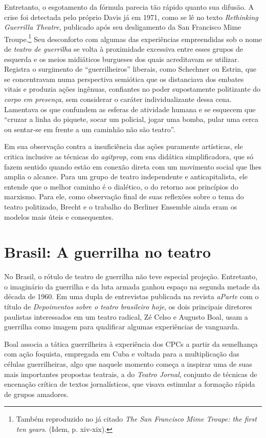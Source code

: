 Entretanto, o esgotamento da fórmula parecia tão rápido quanto sua
difusão. A crise foi detectada pelo próprio Davis já em 1971, como se lê
no texto \textit{Rethinking Guerrilla Theatre}, publicado após seu
desligamento da San Francisco Mime Troupe.\footnote{Também reproduzido
  no já citado \textit{The San Francisco Mime Troupe: the first ten years}.
  (Idem, p. xiv-xix).} Seu desconforto com algumas das experiências
empreendidas sob o nome de \textit{teatro de guerrilha} se volta à
proximidade excessiva entre esses grupos de esquerda e os meios
midiáticos burgueses dos quais acreditavam se utilizar. Registra o
surgimento de “guerrilheiros” liberais, como Schechner ou Estrin, que se
concentravam numa perspectiva semiótica que os distanciava dos embates
vitais e produzia ações ingênuas, confiantes no poder supostamente
politizante do \textit{corpo em presença}, sem considerar o caráter
individualizante dessa cena. Lamentava os que confundem as esferas de
atividade humana e se esquecem que “cruzar a linha do piquete, socar um
policial, jogar uma bomba, pular uma cerca ou sentar-se em frente a um
caminhão não são teatro”.

Em sua observação contra a insuficiência das ações puramente artísticas,
ele critica inclusive as técnicas do \textit{agitprop}, com sua didática
simplificadora, que só fazem sentido quando estão em conexão direta com
um movimento social que lhes amplia o alcance. Para um grupo de teatro
independente e anticapitalista, ele entende que o melhor caminho é o
dialético, o do retorno aos princípios do marxismo. Para ele, como
observação final de suas reflexões sobre o tema do teatro politizado,
Brecht e o trabalho do Berliner Ensemble ainda eram os modelos mais
úteis e consequentes.

\section{Brasil: A guerrilha no teatro}

No Brasil, o rótulo de teatro de guerrilha não teve especial projeção.
Entretanto, o imaginário da guerrilha e da luta armada ganhou espaço na
segunda metade da década de 1960. Em uma dupla de entrevistas publicada
na revista \textit{aParte} com o título de \textit{Depoimentos sobre o teatro
brasileiro hoje}, os dois principais diretores paulistas interessados em
um teatro radical, Zé Celso e Augusto Boal, usam a guerrilha como imagem
para qualificar algumas experiências de vanguarda.

Boal associa a tática guerrilheira à experiência dos CPCs a partir da
semelhança com ação foquista, empregada em Cuba e voltada para a
multiplicação das células guerrilheiras, algo que naquele momento começa
a inspirar uma de suas mais importantes propostas teatrais, a do
\textit{Teatro Jornal}, conjunto de técnicas de encenação crítica de textos
jornalísticos, que visava estimular a formação rápida de grupos
amadores.

